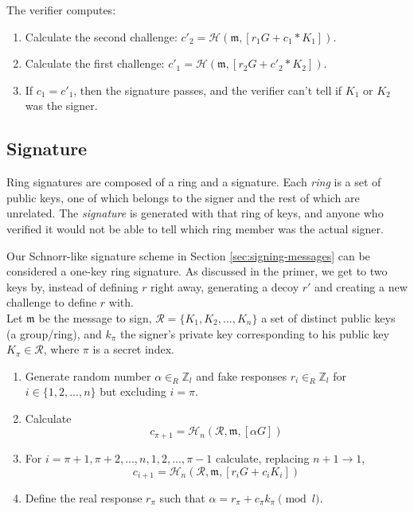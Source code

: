 The verifier computes:

\begin{enumerate}
	\item Calculate the second challenge: \(c'_2 = \mathcal{H}(\mathfrak{m},[r_1 G + c_1*K_1])\).

    \item Calculate the first challenge: \(c'_1 = \mathcal{H}(\mathfrak{m},[r_2 G + c'_2*K_2])\).

	\item If $c_1 = c'_1$, then the signature passes, and the verifier can't tell if $K_1$ or $K_2$ was the signer.
\end{enumerate}


\subsection*{Signature}

Ring signatures are composed of a ring and a signature. Each {\em ring} is a set of public keys, one of which belongs to the signer and the rest of which are unrelated. The {\em signature} is generated with that ring of keys, and anyone who verified it would not be able to tell which ring member was the actual signer.

Our Schnorr-like signature scheme in Section \ref{sec:signing-messages} can be considered a one-key ring signature. As discussed in the primer, we get to two keys by, instead of defining $r$ right away, generating a decoy $r'$ and creating a new challenge to define $r$ with.
\\

Let \(\mathfrak{m}\) be the message to sign, \(\mathcal{R} = \{K_1, K_2, ..., K_n\}\) a set of distinct public keys (a group/ring), and \(k_\pi\) the signer's private key corresponding to his public key \(K_\pi \in \mathcal{R}\), where $\pi$ is a secret index.

\begin{enumerate}
	\item Generate random number \(\alpha \in_R \mathbb{Z}_l\) and fake responses  \(r_i \in_R \mathbb{Z}_l\) for \(i \in \{1, 2, ..., n\}\) but excluding \(i = \pi\).

	\item Calculate%
	\[c_{\pi+1} = \mathcal{H}_n(\mathcal{R}, \mathfrak{m}, [\alpha G])\]

	\item For \(i = \pi+1, \pi+2, ..., n, 1, 2, ..., \pi-1\) calculate, replacing \(n + 1 \rightarrow 1\),\vspace{.175cm}
	\[  c_{i+1} = \mathcal{H}_n(\mathcal{R}, \mathfrak{m}, [r_i G + c_i K_i])\] 

	\item Define the real response $r_\pi$ such that \(\alpha = r_\pi + c_\pi k_\pi \pmod l\).
\end{enumerate}

